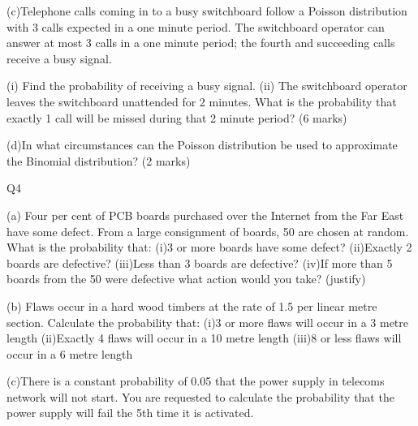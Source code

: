 
(c)Telephone calls coming in to a busy switchboard follow a Poisson distribution with 3 calls expected in a one minute period.  The switchboard operator can answer at most 3 calls in a one minute period; the fourth and succeeding calls receive a busy signal.

(i)   Find the probability of receiving a busy signal.
(ii)   The switchboard operator leaves the switchboard unattended for 2 minutes.  What is the probability that exactly 1 call will be missed during that 2 minute period?
(6 marks)

(d)In what circumstances can the Poisson distribution be used to approximate the Binomial distribution?
(2 marks)


Q4


(a)  Four  per cent of PCB boards purchased over the Internet from the Far East have some defect.  From a large consignment of boards, 50 are chosen at random.  What is the probability that:
(i)3 or more boards have some defect?
(ii)Exactly 2 boards are defective?
(iii)Less than 3 boards are defective?
(iv)If more than 5 boards from the 50 were defective what action would you take? (justify)

(b) Flaws occur in a hard wood timbers  at the rate of 1.5 per linear  metre section.  Calculate the probability that:
(i)3 or more flaws will occur in a 3  metre length 
(ii)Exactly 4 flaws will occur in a 10 metre length
(iii)8 or less flaws will occur in a 6  metre length 

(c)There is a constant probability of 0.05  that the power supply in telecoms network will not start.  You are requested to calculate the probability that the power supply will fail the 5th time it is activated.

\newpage